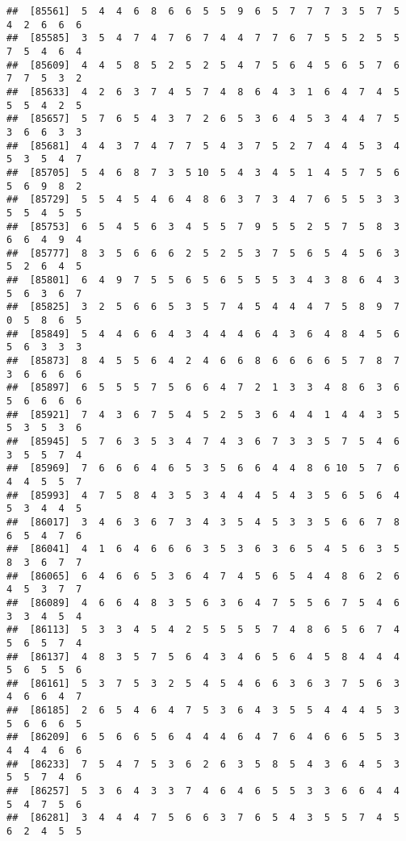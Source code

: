 \documentclass[
]{book}
\begin{document}
\begin{verbatim}
##  [85561]  5  4  4  6  8  6  6  5  5  9  6  5  7  7  7  3  5  7  5  4  2  6  6  6
##  [85585]  3  5  4  7  4  7  6  7  4  4  7  7  6  7  5  5  2  5  5  7  5  4  6  4
##  [85609]  4  4  5  8  5  2  5  2  5  4  7  5  6  4  5  6  5  7  6  7  7  5  3  2
##  [85633]  4  2  6  3  7  4  5  7  4  8  6  4  3  1  6  4  7  4  5  5  5  4  2  5
##  [85657]  5  7  6  5  4  3  7  2  6  5  3  6  4  5  3  4  4  7  5  3  6  6  3  3
##  [85681]  4  4  3  7  4  7  7  5  4  3  7  5  2  7  4  4  5  3  4  5  3  5  4  7
##  [85705]  5  4  6  8  7  3  5 10  5  4  3  4  5  1  4  5  7  5  6  5  6  9  8  2
##  [85729]  5  5  4  5  4  6  4  8  6  3  7  3  4  7  6  5  5  3  3  5  5  4  5  5
##  [85753]  6  5  4  5  6  3  4  5  5  7  9  5  5  2  5  7  5  8  3  6  6  4  9  4
##  [85777]  8  3  5  6  6  6  2  5  2  5  3  7  5  6  5  4  5  6  3  5  2  6  4  5
##  [85801]  6  4  9  7  5  5  6  5  6  5  5  5  3  4  3  8  6  4  3  5  6  3  6  7
##  [85825]  3  2  5  6  6  5  3  5  7  4  5  4  4  4  7  5  8  9  7  0  5  8  6  5
##  [85849]  5  4  4  6  6  4  3  4  4  4  6  4  3  6  4  8  4  5  6  5  6  3  3  3
##  [85873]  8  4  5  5  6  4  2  4  6  6  8  6  6  6  6  5  7  8  7  3  6  6  6  6
##  [85897]  6  5  5  5  7  5  6  6  4  7  2  1  3  3  4  8  6  3  6  5  6  6  6  6
##  [85921]  7  4  3  6  7  5  4  5  2  5  3  6  4  4  1  4  4  3  5  5  3  5  3  6
##  [85945]  5  7  6  3  5  3  4  7  4  3  6  7  3  3  5  7  5  4  6  3  5  5  7  4
##  [85969]  7  6  6  6  4  6  5  3  5  6  6  4  4  8  6 10  5  7  6  4  4  5  5  7
##  [85993]  4  7  5  8  4  3  5  3  4  4  4  5  4  3  5  6  5  6  4  5  3  4  4  5
##  [86017]  3  4  6  3  6  7  3  4  3  5  4  5  3  3  5  6  6  7  8  6  5  4  7  6
##  [86041]  4  1  6  4  6  6  6  3  5  3  6  3  6  5  4  5  6  3  5  8  3  6  7  7
##  [86065]  6  4  6  6  5  3  6  4  7  4  5  6  5  4  4  8  6  2  6  4  5  3  7  7
##  [86089]  4  6  6  4  8  3  5  6  3  6  4  7  5  5  6  7  5  4  6  3  3  4  5  4
##  [86113]  5  3  3  4  5  4  2  5  5  5  5  7  4  8  6  5  6  7  4  5  6  5  7  4
##  [86137]  4  8  3  5  7  5  6  4  3  4  6  5  6  4  5  8  4  4  4  5  6  5  5  6
##  [86161]  5  3  7  5  3  2  5  4  5  4  6  6  3  6  3  7  5  6  3  4  6  6  4  7
##  [86185]  2  6  5  4  6  4  7  5  3  6  4  3  5  5  4  4  4  5  3  5  6  6  6  5
##  [86209]  6  5  6  6  5  6  4  4  4  6  4  7  6  4  6  6  5  5  3  4  4  4  6  6
##  [86233]  7  5  4  7  5  3  6  2  6  3  5  8  5  4  3  6  4  5  3  5  5  7  4  6
##  [86257]  5  3  6  4  3  3  7  4  6  4  6  5  5  3  3  6  6  4  4  5  4  7  5  6
##  [86281]  3  4  4  4  7  5  6  6  3  7  6  5  4  3  5  5  7  4  5  6  2  4  5  5

\end{verbatim}
\end{document}

